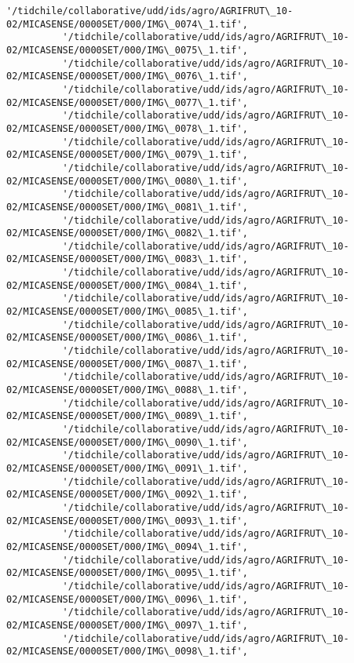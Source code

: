 \documentclass[11pt]{article}
\begin{document}
\begin{Verbatim}[commandchars=\\\{\}]
          '/tidchile/collaborative/udd/ids/agro/AGRIFRUT\_10-02/MICASENSE/0000SET/000/IMG\_0074\_1.tif',
          '/tidchile/collaborative/udd/ids/agro/AGRIFRUT\_10-02/MICASENSE/0000SET/000/IMG\_0075\_1.tif',
          '/tidchile/collaborative/udd/ids/agro/AGRIFRUT\_10-02/MICASENSE/0000SET/000/IMG\_0076\_1.tif',
          '/tidchile/collaborative/udd/ids/agro/AGRIFRUT\_10-02/MICASENSE/0000SET/000/IMG\_0077\_1.tif',
          '/tidchile/collaborative/udd/ids/agro/AGRIFRUT\_10-02/MICASENSE/0000SET/000/IMG\_0078\_1.tif',
          '/tidchile/collaborative/udd/ids/agro/AGRIFRUT\_10-02/MICASENSE/0000SET/000/IMG\_0079\_1.tif',
          '/tidchile/collaborative/udd/ids/agro/AGRIFRUT\_10-02/MICASENSE/0000SET/000/IMG\_0080\_1.tif',
          '/tidchile/collaborative/udd/ids/agro/AGRIFRUT\_10-02/MICASENSE/0000SET/000/IMG\_0081\_1.tif',
          '/tidchile/collaborative/udd/ids/agro/AGRIFRUT\_10-02/MICASENSE/0000SET/000/IMG\_0082\_1.tif',
          '/tidchile/collaborative/udd/ids/agro/AGRIFRUT\_10-02/MICASENSE/0000SET/000/IMG\_0083\_1.tif',
          '/tidchile/collaborative/udd/ids/agro/AGRIFRUT\_10-02/MICASENSE/0000SET/000/IMG\_0084\_1.tif',
          '/tidchile/collaborative/udd/ids/agro/AGRIFRUT\_10-02/MICASENSE/0000SET/000/IMG\_0085\_1.tif',
          '/tidchile/collaborative/udd/ids/agro/AGRIFRUT\_10-02/MICASENSE/0000SET/000/IMG\_0086\_1.tif',
          '/tidchile/collaborative/udd/ids/agro/AGRIFRUT\_10-02/MICASENSE/0000SET/000/IMG\_0087\_1.tif',
          '/tidchile/collaborative/udd/ids/agro/AGRIFRUT\_10-02/MICASENSE/0000SET/000/IMG\_0088\_1.tif',
          '/tidchile/collaborative/udd/ids/agro/AGRIFRUT\_10-02/MICASENSE/0000SET/000/IMG\_0089\_1.tif',
          '/tidchile/collaborative/udd/ids/agro/AGRIFRUT\_10-02/MICASENSE/0000SET/000/IMG\_0090\_1.tif',
          '/tidchile/collaborative/udd/ids/agro/AGRIFRUT\_10-02/MICASENSE/0000SET/000/IMG\_0091\_1.tif',
          '/tidchile/collaborative/udd/ids/agro/AGRIFRUT\_10-02/MICASENSE/0000SET/000/IMG\_0092\_1.tif',
          '/tidchile/collaborative/udd/ids/agro/AGRIFRUT\_10-02/MICASENSE/0000SET/000/IMG\_0093\_1.tif',
          '/tidchile/collaborative/udd/ids/agro/AGRIFRUT\_10-02/MICASENSE/0000SET/000/IMG\_0094\_1.tif',
          '/tidchile/collaborative/udd/ids/agro/AGRIFRUT\_10-02/MICASENSE/0000SET/000/IMG\_0095\_1.tif',
          '/tidchile/collaborative/udd/ids/agro/AGRIFRUT\_10-02/MICASENSE/0000SET/000/IMG\_0096\_1.tif',
          '/tidchile/collaborative/udd/ids/agro/AGRIFRUT\_10-02/MICASENSE/0000SET/000/IMG\_0097\_1.tif',
          '/tidchile/collaborative/udd/ids/agro/AGRIFRUT\_10-02/MICASENSE/0000SET/000/IMG\_0098\_1.tif',

\end{Verbatim}
\end{document}
